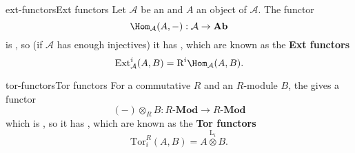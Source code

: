 \begin{topic}{ext-functors}{Ext functors}
    Let $\mathcal{A}$ be an  and $A$ an object of $\mathcal{A}$. The functor
    \[ \Hom_{\mathcal{A}}(A, -) : \mathcal{A} \to \textbf{Ab} \]
    is , so (if $\mathcal{A}$ has enough injectives) it has , which are known as the \textbf{Ext functors}
    \[ \text{Ext}^i_\mathcal{A}(A, B) = \text{R}^i \Hom_\mathcal{A}(A, B) . \]
\end{topic}

\begin{topic}{tor-functors}{Tor functors}
    For a commutative  $R$ and an $R$-module $B$, the  gives a functor
    \[ (-) \otimes_R B : R\textbf{-Mod} \to R\textbf{-Mod} \]
    which is , so it has , which are known as the \textbf{Tor functors}
    \[ \text{Tor}^R_i(A, B) = A \overset{\text{L}_i}{\otimes} B . \]
\end{topic}

